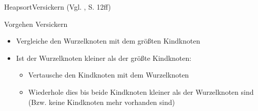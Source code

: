 \begin{frame}{Heapsort}{Versickern (Vgl. \cite{fahr:algo}, S. 12ff)}
\begin{alertblock}{Vorgehen Versickern}
\begin{itemize}
    \item Vergleiche den Wurzelknoten mit dem größten Kindknoten
    \item Ist der Wurzelknoten kleiner als der größte Kindknoten:
    \begin{itemize}
        \item Vertausche den Kindknoten mit dem Wurzelknoten
        \item Wiederhole dies bis beide Kindknoten kleiner als der Wurzelknoten sind (Bzw. keine Kindknoten mehr vorhanden sind)
    \end{itemize}
\end{itemize}
\end{alertblock}
\end{frame}